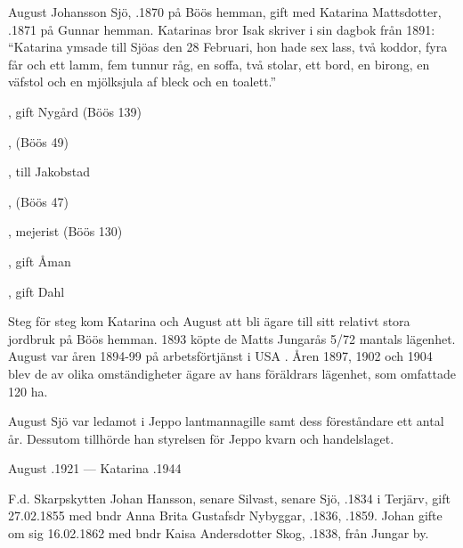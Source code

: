August Johansson Sjö, .1870 på Böös hemman, gift med Katarina Mattsdotter, .1871 på Gunnar hemman. Katarinas bror Isak skriver i sin dagbok från 1891: ``Katarina ymsade till Sjöas den 28 Februari, hon hade sex lass, två koddor, fyra får och ett lamm, fem tunnur råg, en soffa, två stolar, ett bord, en birong, en väfstol och en mjölksjula af bleck och en toalett.''
\begin{jhchildren}
  \item {}, gift Nygård (Böös 139)
  \item {}, (Böös 49)
  \item {}, till Jakobstad
  \item {}
  \item {}, (Böös 47)
  \item {}
  \item {}
  \item {}, mejerist (Böös 130)
  \item {}, gift Åman
  \item {}, gift Dahl
  \item {}
\end{jhchildren}
Steg för steg kom Katarina och August att bli ägare till sitt relativt stora jordbruk på Böös hemman. 1893 köpte de Matts Jungarås 5/72 mantals lägenhet. August var åren 1894-99 på arbetsförtjänst i USA . Åren 1897, 1902 och 1904 blev de av olika omständigheter ägare av hans föräldrars lägenhet, som omfattade 120 ha.

August Sjö var ledamot i Jeppo lantmannagille samt dess föreståndare ett antal år. Dessutom tillhörde han styrelsen för Jeppo kvarn och handelslaget.

August .1921  ---  Katarina .1944


F.d. Skarpskytten Johan Hansson, senare Silvast, senare Sjö, .1834 i Terjärv, gift 27.02.1855 med bndr Anna Brita Gustafsdr Nybyggar, .1836, .1859. Johan gifte om sig 16.02.1862 med bndr Kaisa Andersdotter Skog, .1838, från Jungar by.

